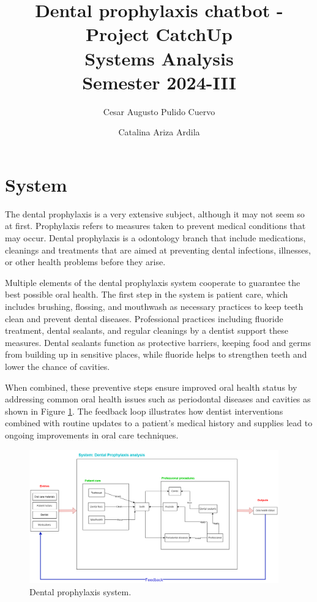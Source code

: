 \documentclass[12pt]{article}
\title{Dental prophylaxis chatbot - Project CatchUp \\ \large Systems Analysis \\ \large Semester 2024-III}
\author{Cesar Augusto Pulido Cuervo \and Catalina Ariza Ardila}
\date{}
\begin{document}
\maketitle

\section*{System}

The dental prophylaxis is a very extensive subject, although it may not seem so at first. Prophylaxis refers to measures taken to prevent medical conditions that may occur. Dental prophylaxis is a odontology branch that include medications, cleanings and treatments that are aimed at preventing dental infections, illnesses, or other health problems before they arise.

Multiple elements of the dental prophylaxis system cooperate to guarantee the best possible oral health. The first step in the system is patient care, which includes brushing, flossing, and mouthwash as necessary practices to keep teeth clean and prevent dental diseases. Professional practices including fluoride treatment, dental sealants, and regular cleanings by a dentist support these measures. Dental sealants function as protective barriers, keeping food and germs from building up in sensitive places, while fluoride helps to strengthen teeth and lower the chance of cavities.

When combined, these preventive steps ensure improved oral health status by addressing common oral health issues such as periodontal diseases and cavities as shown in Figure \ref{fig:system}. The feedback loop illustrates how dentist interventions combined with routine updates to a patient's medical history and supplies lead to ongoing improvements in oral care techniques.

\begin{figure}[htbp]
\centerline{\includegraphics[width=0.96\textwidth]{figures/system.png}}
\caption{Dental prophylaxis system.}
\label{fig:system}
\end{figure}
\end{document}
